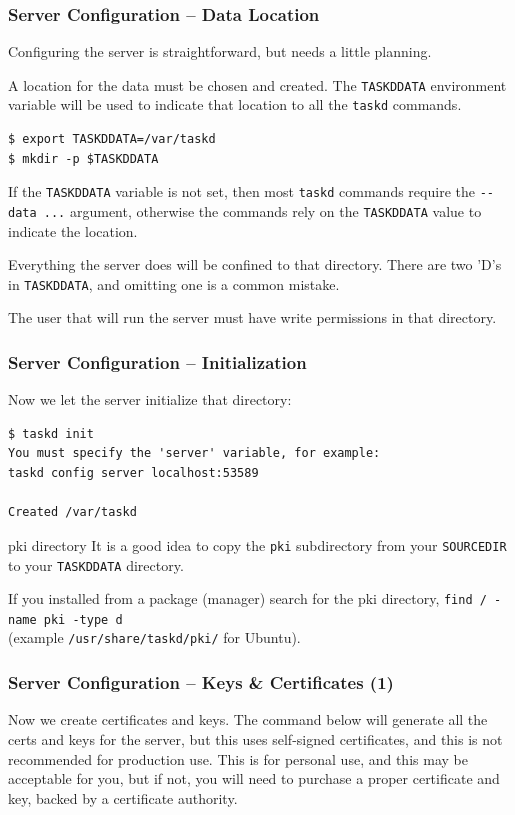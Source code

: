 \documentclass[t,handout]{beamer}
\begin{document}
\begin{frame}[fragile]\frametitle{Server Configuration -- Data Location}\label{serverconfiguration}
    \vfill
    Configuring the server is straightforward, but needs a little planning.

    A location for the data must be chosen and created. The \verb+TASKDDATA+ environment variable will be used to indicate that location to all the \verb+taskd+ commands.

    \begin{lstlisting}
$ export TASKDDATA=/var/taskd
$ mkdir -p $TASKDDATA\end{lstlisting}

    If the \verb+TASKDDATA+ variable is not set, then most \verb+taskd+ commands require the \verb+--data ...+ argument, otherwise the commands rely on the \verb+TASKDDATA+ value to indicate the location.

    \begin{alertblock}{Everything the server does will be confined to that directory.}
        There are two 'D's in \verb+TASKDDATA+, and omitting one is a common mistake.

        The user that will run the server must have write permissions in that directory.
	\end{alertblock}
\end{frame}

\begin{frame}[fragile]\frametitle{Server Configuration -- Initialization}
    \vfill
    Now we let the server initialize that directory:

    \begin{lstlisting}
$ taskd init
You must specify the 'server' variable, for example:
taskd config server localhost:53589

Created /var/taskd\end{lstlisting}

    \begin{alertblock}{pki directory}
        It is a good idea to copy the \verb=pki= subdirectory from your \verb=SOURCEDIR= to your \verb=TASKDDATA= directory.

        If you installed from a package (manager) search for the pki directory, \verb+find / -name pki -type d+ \\ (example \verb+/usr/share/taskd/pki/+ for Ubuntu).
    \end{alertblock}
\end{frame}

\begin{frame}[fragile]\frametitle{Server Configuration -- Keys \& Certificates (1)}
    \vfill
    Now we create certificates and keys. The command below will generate all the certs and keys for the server, but this uses self-signed certificates, and this is not recommended for production use. This is for personal use, and this may be acceptable for you, but if not, you will need to purchase a proper certificate and key, backed by a certificate authority.
\end{frame}
\end{document}
